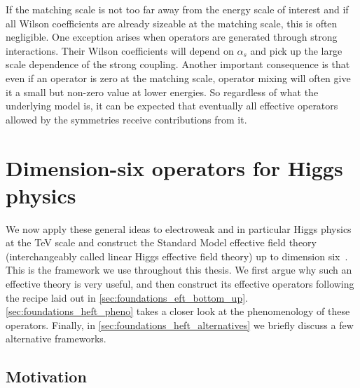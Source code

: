 If the matching scale is not too far away from the energy scale of
interest and if all Wilson coefficients are already sizeable at the
matching scale, this is often negligible. One exception arises when
operators are generated through strong interactions. Their Wilson
coefficients will depend on $\alpha_s$ and pick up the large scale
dependence of the strong coupling. Another important consequence is
that even if an operator is zero at the matching scale, operator
mixing will often give it a small but non-zero value at lower
energies. So regardless of what the underlying model is, it can be
expected that eventually all effective operators allowed by the
symmetries receive contributions from it.



\section{Dimension-six operators for Higgs physics}
\label{sec:foundations_higgs_eft}

We now apply these general ideas to electroweak and in particular
Higgs physics at the TeV scale and construct the Standard Model
effective field theory (interchangeably called linear Higgs effective
field theory) up to dimension six~\cite{Burges:1983zg, Leung:1984ni,
  Buchmuller:1985jz, Arzt:1994gp}. This is the framework we use
throughout this thesis. We first argue why such an effective
theory is very useful, and then construct its effective operators
following the recipe laid out in
\autoref{sec:foundations_eft_bottom_up}. \autoref{sec:foundations_heft_pheno}
takes a closer look at the phenomenology of these
operators. Finally, in \autoref{sec:foundations_heft_alternatives}
we briefly discuss a few alternative frameworks.


  

\subsection{Motivation}
\label{sec:foundations_heft_motivation}


